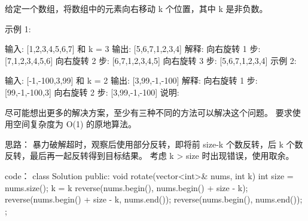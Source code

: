 给定一个数组，将数组中的元素向右移动 k 个位置，其中 k 是非负数。

示例 1:

输入: [1,2,3,4,5,6,7] 和 k = 3
输出: [5,6,7,1,2,3,4]
解释:
向右旋转 1 步: [7,1,2,3,4,5,6]
向右旋转 2 步: [6,7,1,2,3,4,5]
向右旋转 3 步: [5,6,7,1,2,3,4]
示例 2:

输入: [-1,-100,3,99] 和 k = 2
输出: [3,99,-1,-100]
解释: 
向右旋转 1 步: [99,-1,-100,3]
向右旋转 2 步: [3,99,-1,-100]
说明:

尽可能想出更多的解决方案，至少有三种不同的方法可以解决这个问题。
要求使用空间复杂度为 O(1) 的原地算法。



















思路：
暴力破解超时，观察后使用部分反转，即将前 size-k 个数反转，后 k 个数反转，最后再一起反转得到目标结果。
考虑 k > size 时出现错误，使用取余。


















code：
class Solution {
public:
    void rotate(vector<int>& nums, int k) {
        int size = nums.size();
        k = k %
        reverse(nums.begin(), nums.begin() + size - k);
        reverse(nums.begin() + size - k, nums.end());
        reverse(nums.begin(), nums.end());
    }
};
